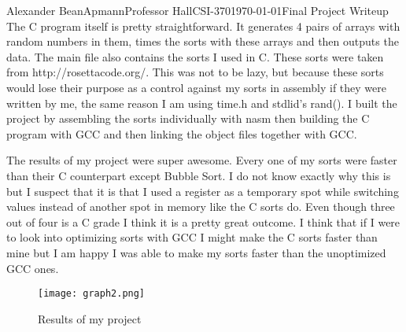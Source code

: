 \documentclass[11pt,letterpaper]{article}
\begin{document}
\begin{mla}{Alexander Bean}{Apmann}{Professor Hall}{CSI-370}{\today}{Final Project Writeup}
The C program itself is pretty straightforward. It generates 4 pairs of arrays with random numbers in them, times the sorts with these arrays and then outputs the data. The main file also contains the sorts I used in C. These sorts were taken from http://rosettacode.org/. This was not to be lazy, but because these sorts would lose their purpose as a control against my sorts in assembly if they were written by me, the same reason I am using time.h and stdlid's rand(). I built the project by assembling the sorts individually with nasm then building the C program with GCC and then linking the object files together with GCC.

The results of my project were super awesome. Every one of my sorts were faster than their C counterpart except Bubble Sort. I do not know exactly why this is but I suspect that it is that I used a register as a temporary spot while switching values instead of another spot in memory like the C sorts do. Even though three out of four is a C grade I think it is a pretty great outcome. I think that if I were to look into optimizing sorts with GCC I might make the C sorts faster than mine but I am happy I was able to make my sorts faster than the unoptimized GCC ones.

\begin{figure}[h!]
	\caption{Results of my project}
	\centering
		\texttt{[image: graph2.png]}
\end{figure}


\end{mla}
\end{document}
